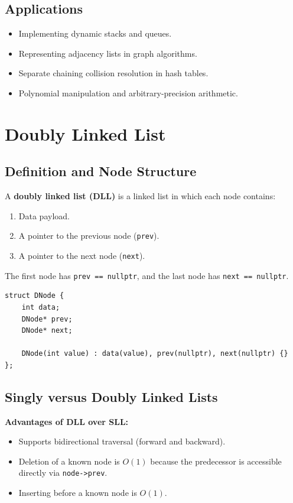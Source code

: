 \subsection{Applications}
\begin{itemize}
    \item Implementing dynamic stacks and queues.
    \item Representing adjacency lists in graph algorithms.
    \item Separate chaining collision resolution in hash tables.
    \item Polynomial manipulation and arbitrary-precision arithmetic.
\end{itemize}

\section{Doubly Linked List}

\subsection{Definition and Node Structure}

A \textbf{doubly linked list (DLL)} is a linked list in which each node contains:
\begin{enumerate}
    \item Data payload.
    \item A pointer to the previous node (\texttt{prev}).
    \item A pointer to the next node (\texttt{next}).
\end{enumerate}

The first node has \texttt{prev == nullptr}, and the last node has \texttt{next == nullptr}.

\begin{lstlisting}[style=cppstyle]
struct DNode {
    int data;
    DNode* prev;
    DNode* next;

    DNode(int value) : data(value), prev(nullptr), next(nullptr) {}
};
\end{lstlisting}

\subsection{Singly versus Doubly Linked Lists}

\textbf{Advantages of DLL over SLL:}
\begin{itemize}
    \item Supports bidirectional traversal (forward and backward).
    \item Deletion of a known node is $O(1)$ because the predecessor is accessible directly via \texttt{node->prev}.
    \item Inserting before a known node is $O(1)$.
\end{itemize}

